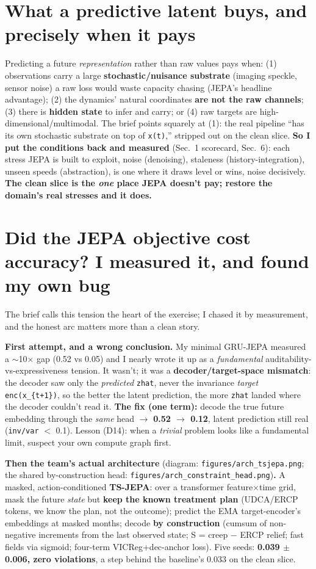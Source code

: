 \section{What a predictive latent buys, and precisely when it pays}

Predicting a future \textit{representation} rather than raw values pays when: (1) observations carry a
large \textbf{stochastic/nuisance substrate} (imaging speckle, sensor noise) a raw loss would waste
capacity chasing (JEPA's headline advantage); (2) the dynamics' natural coordinates \textbf{are not the
raw channels}; (3) there is \textbf{hidden state} to infer and carry; or (4) raw targets are
high-dimensional/multimodal. The brief points squarely at (1): the real pipeline ``has its own stochastic
substrate on top of \texttt{x(t)},'' stripped out on the clean slice. \textbf{So I put the conditions back
and measured} (Sec.~1 scorecard, Sec.~6): each stress JEPA is built to exploit, noise (denoising), staleness
(history-integration), unseen speeds (abstraction), is one where it draws level or wins, noise
decisively. \textbf{The clean slice is the \textit{one} place JEPA doesn't pay; restore the domain's real
stresses and it does.}

\section{Did the JEPA objective cost accuracy? I measured it, and found my own bug}

The brief calls this tension the heart of the exercise; I chased it by measurement, and the honest arc
matters more than a clean story.

\textbf{First attempt, and a wrong conclusion.} My minimal GRU-JEPA measured a $\sim$10$\times$ gap (0.52
vs 0.05) and I nearly wrote it up as a \textit{fundamental} auditability-vs-expressiveness tension. It
wasn't; it was a \textbf{decoder/target-space mismatch}: the decoder saw only the \textit{predicted}
\texttt{zhat}, never the invariance \textit{target} \texttt{enc(x\_\{t+1\})}, so the better the latent
prediction, the more \texttt{zhat} landed where the decoder couldn't read it. \textbf{The fix (one term):}
decode the true future embedding through the \textit{same} head $\to$ \textbf{0.52 $\to$ 0.12}, latent
prediction still real (\texttt{inv/var} $<$ 0.1). Lesson (D14): when a \textit{trivial} problem looks like
a fundamental limit, suspect your own compute graph first.

\textbf{Then the team's actual architecture} (diagram: \texttt{figures/arch\_tsjepa.png}; the shared
by-construction head: \texttt{figures/arch\_constraint\_head.png})\textbf{.} A masked, action-conditioned
\textbf{TS-JEPA}: over a transformer feature$\times$time grid, mask the future \textit{state} but
\textbf{keep the known treatment plan} (UDCA/ERCP tokens, we know the plan, not the outcome); predict
the EMA target-encoder's embeddings at masked months; decode \textbf{by construction} (cumsum of
non-negative increments from the last observed state; S = creep $-$ ERCP relief; fast fields via sigmoid;
four-term VICReg+dec-anchor loss). Five seeds: \textbf{0.039 $\pm$ 0.006, zero violations}, a step
behind the baseline's 0.033 on the clean slice.

